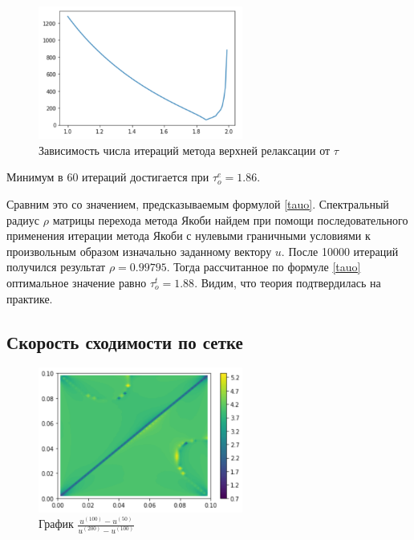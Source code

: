 \documentclass[report , a4paper, onecolumn, 12pt]{article}
\begin{document}
\begin{figure}[]
    \centering
    \includegraphics[width=0.6\textwidth]{taus}
    \caption{Зависимость числа итераций метода верхней релаксации от $\tau$}
    \label{fig:taus}
\end{figure}

Минимум в 60 итераций достигается при $\tau_o^e = 1.86$. 

Сравним это со значением, предсказываемым формулой \ref{tauo}. Спектральный радиус $\rho$ матрицы перехода метода Якоби найдем при помощи последовательного применения итерации метода Якоби с нулевыми граничными условиями к произвольным образом изначально заданному вектору $u$. После 10000 итераций получился результат $\rho = 0.99795$. Тогда рассчитанное по формуле \ref{tauo} оптимальное значение равно $\tau_o^t = 1.88$. Видим, что теория подтвердилась на практике.

\subsection{Скорость сходимости по сетке}

\begin{figure}[]
    \centering
    \includegraphics[width=0.6\textwidth]{errors}
    \caption{График $\frac{u^{(100)} - u^{(50)}}{u^{(200)} - u^{(100)}}$}
    \label{fig:errors}
\end{figure}
\end{document}
